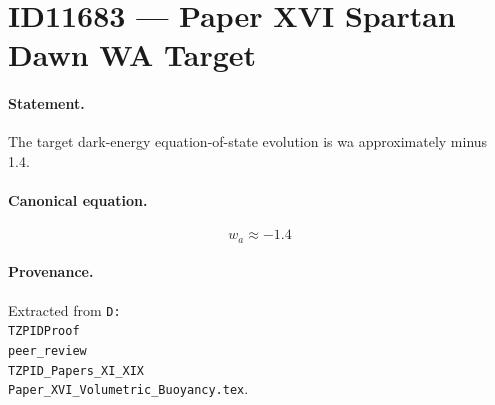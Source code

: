 \section*{ID11683 --- Paper XVI Spartan Dawn WA Target}

\paragraph{Statement.}
The target dark-energy equation-of-state evolution is wa approximately minus 1.4.

\paragraph{Canonical equation.}
\[
w_a\approx-1.4
\]

\paragraph{Provenance.}
Extracted from \texttt{D:\\TZPIDProof\\peer\_review\\TZPID\_Papers\_XI\_XIX\\Paper\_XVI\_Volumetric\_Buoyancy.tex}.
